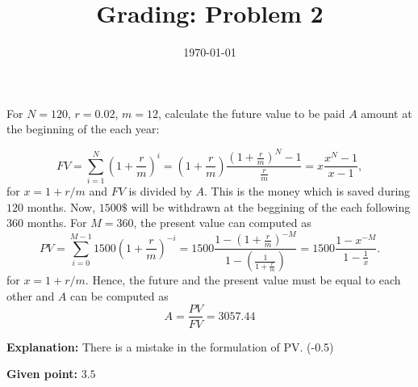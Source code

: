 \documentclass[12pt,a4paper,oneside]{article}
\title{Grading: Problem 2}
\date{\vspace{-6ex}\today}
\begin{document}
\maketitle

For $N=120$, $r=0.02$, $m=12$, calculate the future value to be paid $A$ amount at the beginning of the each year:

\begin{equation}
  FV = \sum_{i=1}^{N}\left(1+\frac{r}{m}\right)^i =
  \left(1+\frac{r}{m}\right)
  \frac{\left(1+\frac{r}{m}\right)^{N}-1}{\frac{r}{m}}=
  x\frac{x^N-1}{x-1},
\end{equation}
for $x=1+r/m$ and $FV$ is divided by $A$.
This is the money which is saved during $120$ months. Now, $1500\$ $ will be withdrawn at the beggining of the each following $360$ months. For $M=360$, the present value can computed as
\begin{equation}
  PV = \sum_{i=0}^{M-1}1500\left(1+\frac{r}{m}\right)^{-i} =
  1500\frac{1-\left(1+\frac{r}{m}\right)^{-M}}
  {1-\left(\frac{1}{1+\frac{r}{m}}\right)}
  = 1500 \frac{1-x^{-M}}{1-\frac{1}{x}}.
\end{equation}
for $x=1+r/m$.
Hence, the future and the present value must be equal to each other and $A$ can be computed as
\begin{equation}
  A = \frac{PV}{FV} = 3057.44
\end{equation}

\vspace{6ex}
\textbf{Explanation:} There is a mistake in the formulation of PV. (-0.5)

\textbf{Given point:} $3.5$
\end{document}

